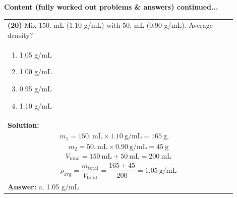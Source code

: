 \documentclass{article}
\begin{document}
{\newpage
\noindent
{\large\textbf{Content (fully worked out problems \& answers) continued...}}\\[0.2em]
\vspace{0.2cm}
\begin{tabular}{|p{0.9\linewidth}|}
\hline
\vspace{0.2cm}
\textbf{(20)} Mix 150. mL (1.10 g/mL) with 50. mL (0.90 g/mL). Average density? \\
\begin{minipage}[t]{0.85\linewidth}
\begin{enumerate}[label=\alph*.]
   \item 1.05 g/mL
   \item 1.00 g/mL
   \item 0.95 g/mL
   \item 1.10 g/mL
\end{enumerate}
\end{minipage}\\
\hline
\vspace{0.2cm}
\textbf{Solution:} \\
\[
m_1 = 150.~\text{mL} \times 1.10~\text{g/mL} = 165~\text{g}, \quad
\] \\
\[
m_2 = 50.~\text{mL} \times 0.90~\text{g/mL} = 45~\text{g}
\] \\
\[
V_\text{total} = 150~\text{mL} + 50~\text{mL} = 200~\text{mL} 
\] \\
\[
\rho_\text{avg} = \frac{m_\text{total}}{V_\text{total}} = \frac{165 + 45}{200} = 1.05~\text{g/mL} 
\] \\ 
\hline
\vspace{0.2cm}
\textbf{Answer:} a. 1.05 g/mL \\
\hline
\end{tabular}

}
\end{document}
